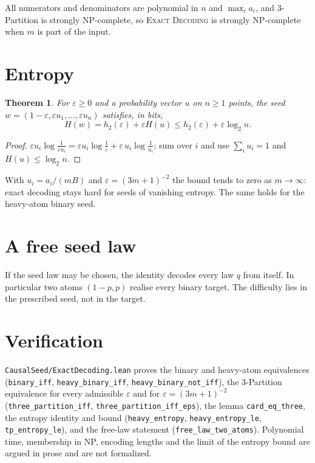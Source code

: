 \documentclass[11pt,a4paper]{article}
\newtheorem{theorem}{Theorem}
\theoremstyle{definition}
\theoremstyle{remark}
\begin{document}
All numerators and denominators are polynomial in \(n\) and \(\max_i a_i\), and
3-Partition is strongly NP-complete, so \textsc{Exact Decoding} is strongly
NP-complete when \(m\) is part of the input.

\section{Entropy}

\begin{theorem}
For \(\varepsilon\ge0\) and a probability vector \(u\) on \(n\ge1\) points,
the seed \(w=(1-\varepsilon,\varepsilon u_1,\dots,\varepsilon u_n)\) satisfies, in bits,
\[
  H(w)=h_2(\varepsilon)+\varepsilon H(u)\le h_2(\varepsilon)+\varepsilon\log_2 n .
\]
\end{theorem}

\begin{proof}
\(\varepsilon u_i\log\frac{1}{\varepsilon u_i}
=\varepsilon u_i\log\frac1\varepsilon+\varepsilon\,u_i\log\frac1{u_i}\); sum over
\(i\) and use \(\sum_i u_i=1\) and \(H(u)\le\log_2 n\).
\end{proof}

With \(u_i=a_i/(mB)\) and \(\varepsilon=(3m+1)^{-2}\) the bound tends to zero as
\(m\to\infty\): exact decoding stays hard for seeds of vanishing entropy. The same
holds for the heavy-atom binary seed.

\section{A free seed law}

If the seed law may be chosen, the identity decodes every law \(q\) from itself.
In particular two atoms \((1-p,p)\) realise every binary target. The difficulty
lies in the prescribed seed, not in the target.

\section*{Verification}

\texttt{CausalSeed/ExactDecoding.lean} proves the binary and heavy-atom
equivalences (\texttt{binary\_iff}, \texttt{heavy\_binary\_iff},
\texttt{heavy\_binary\_not\_iff}), the 3-Partition equivalence for every admissible
\(\varepsilon\) and for \(\varepsilon=(3m+1)^{-2}\)
(\texttt{three\_partition\_iff}, \texttt{three\_partition\_iff\_eps}), the lemma
\texttt{card\_eq\_three}, the entropy identity and bound
(\texttt{heavy\_entropy}, \texttt{heavy\_entropy\_le}, \texttt{tp\_entropy\_le}),
and the free-law statement (\texttt{free\_law\_two\_atoms}). Polynomial time,
membership in NP, encoding lengths and the limit of the entropy bound are
argued in prose and are not formalized.
\end{document}
